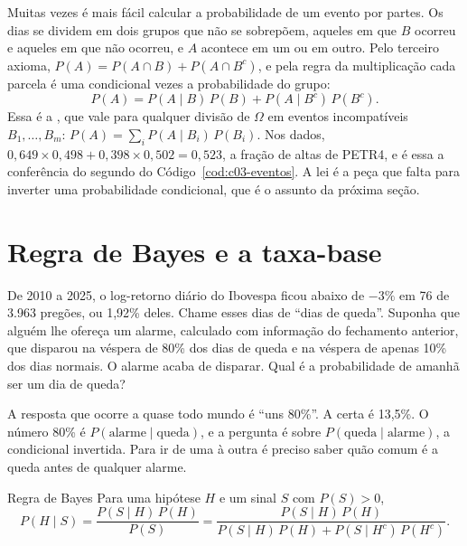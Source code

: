 Muitas vezes é mais fácil calcular a probabilidade de um evento por partes. Os dias se dividem em dois grupos que não se sobrepõem, aqueles em que $B$ ocorreu e aqueles em que não ocorreu, e $A$ acontece em um ou em outro. Pelo terceiro axioma, $P(A) = P(A \cap B) + P(A \cap B^c)$, e pela regra da multiplicação cada parcela é uma condicional vezes a probabilidade do grupo:
\begin{equation}
  P(A) = P(A \mid B)\,P(B) + P(A \mid B^c)\,P(B^c) .
  \label{eq:c03-total}
\end{equation}
Essa é a , que vale para qualquer divisão de $\Omega$ em eventos incompatíveis $B_1, \dots, B_m$: $P(A) = \sum_i P(A \mid B_i)\,P(B_i)$. Nos dados, $0,649 \times 0,498 + 0,398 \times 0,502 = 0,523$, a fração de altas de PETR4, e é essa a conferência do segundo  do Código~\ref{cod:c03-eventos}. A lei é a peça que falta para inverter uma probabilidade condicional, que é o assunto da próxima seção.

\section{Regra de Bayes e a taxa-base}
\label{sec:c03-bayes}

De 2010 a 2025, o log-retorno diário do Ibovespa ficou abaixo de $-3\%$ em 76 de 3.963 pregões, ou 1,92\% deles. Chame esses dias de ``dias de queda''. Suponha que alguém lhe ofereça um alarme, calculado com informação do fechamento anterior, que disparou na véspera de 80\% dos dias de queda e na véspera de apenas 10\% dos dias normais. O alarme acaba de disparar. Qual é a probabilidade de amanhã ser um dia de queda?

A resposta que ocorre a quase todo mundo é ``uns 80\%''. A certa é 13,5\%. O número 80\% é $P(\text{alarme} \mid \text{queda})$, e a pergunta é sobre $P(\text{queda} \mid \text{alarme})$, a condicional invertida. Para ir de uma à outra é preciso saber quão comum é a queda antes de qualquer alarme.

\begin{resultado}{Regra de Bayes}
Para uma hipótese $H$ e um sinal $S$ com $P(S) > 0$,
\begin{equation}
  P(H \mid S) = \frac{P(S \mid H)\,P(H)}{P(S)} =
  \frac{P(S \mid H)\,P(H)}{P(S \mid H)\,P(H) + P(S \mid H^c)\,P(H^c)} .
  \label{eq:c03-bayes}
\end{equation}
\end{resultado}

